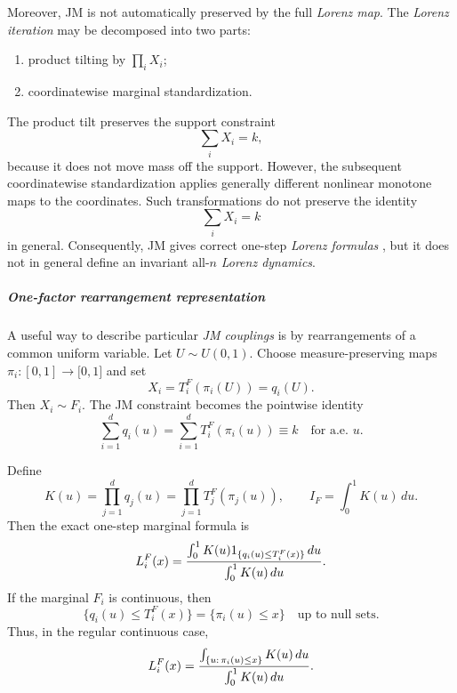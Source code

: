 \documentclass[onecolumn]{article}
\begin{document}
Moreover, JM is not automatically preserved by the full \textit{Lorenz map}.
The \textit{Lorenz iteration} may be decomposed into two parts:

\begin{enumerate}
\item product tilting by $\prod_iX_i$;

\item coordinatewise marginal standardization.
\end{enumerate}

The product tilt preserves the support constraint 
\begin{equation*}
\sum_{i}X_{i}=k,
\end{equation*}%
because it does not move mass off the support. However, the subsequent
coordinatewise standardization applies generally different nonlinear
monotone maps to the coordinates. Such transformations do not preserve the
identity 
\begin{equation*}
\sum_{i}X_{i}=k
\end{equation*}%
in general. Consequently, JM gives correct one-step \textit{Lorenz formulas}%
, but it does not in general define an invariant all-$n$ \textit{Lorenz
dynamics}.

\subparagraph{One-factor rearrangement representation}

A useful way to describe particular \textit{JM couplings} is by
rearrangements of a common uniform variable. Let $U\sim U(0,1)$. Choose
measure-preserving maps $\pi _{i}:[0,1]\rightarrow \lbrack 0,1]$ and set 
\begin{equation}
X_{i}=T_{i}^{F}(\pi _{i}(U))=q_{i}(U).  \label{2063}
\end{equation}%
Then $X_{i}\sim F_{i}$. The JM constraint becomes the pointwise identity 
\begin{equation}
\sum_{i=1}^{d}q_{i}(u)=\sum_{i=1}^{d}T_{i}^{F}(\pi _{i}(u))\equiv k\quad 
\text{for a.e. }u.  \label{2064}
\end{equation}

Define 
\begin{equation}
K(u)=\prod_{j=1}^{d}q_{j}(u)=\prod_{j=1}^{d}T_{j}^{F}(\pi _{j}(u)),\qquad
I_{F}=\int_{0}^{1}K(u)\,du.  \label{2065}
\end{equation}%
Then the exact one-step marginal formula is 
\begin{equation}
L_{i}^{F}(x)=\frac{\int_{0}^{1}K(u)1_{\{q_{i}(u)\leq T_{i}^{F}(x)\}}\,du}{%
\int_{0}^{1}K(u)\,du}.  \label{2067}
\end{equation}%
If the marginal $F_{i}$ is continuous, then 
\begin{equation*}
\{q_{i}(u)\leq T_{i}^{F}(x)\}=\{\pi _{i}(u)\leq x\}\quad \text{up to null
sets}.
\end{equation*}%
Thus, in the regular continuous case, 
\begin{equation}
L_{i}^{F}(x)=\frac{\int_{\{u:\,\pi _{i}(u)\leq x\}}K(u)\,du}{%
\int_{0}^{1}K(u)\,du}.  \label{2066}
\end{equation}
\end{document}
